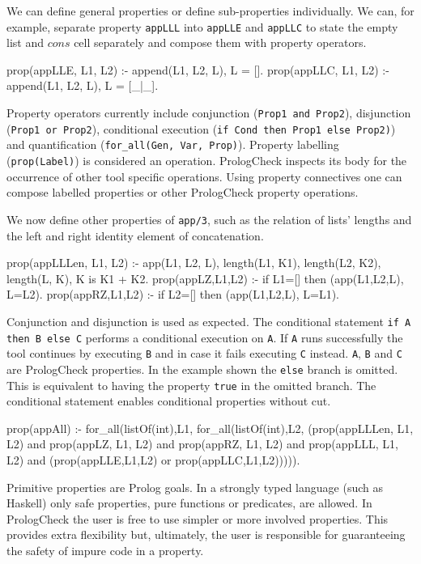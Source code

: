 \documentclass[runningheads,a4paper]{llncs}
\newcommand{\yap}[1]{\lstinline[style=yap]{#1}}
\newcommand{\Prolog}[0]{{\sf Prolog}}
\newcommand{\Haskell}[0]{{\sf Haskell}}
\newcommand{\plqc}[0]{{\sf PrologCheck}}
\begin{document}
We can define general properties or define sub-properties individually. 
%
We can, for example, separate property \yap{appLLL} into
\yap{appLLE} and \yap{appLLC} to state the empty list and $cons$
cell separately and compose them with property operators.
%
\begin{yapcode}
 prop({appLLE, L1, L2}) :- append(L1, L2, L), L = [].
 prop({appLLC, L1, L2}) :- append(L1, L2, L), L = [_|_].
\end{yapcode}


Property operators currently  include conjunction
 (\yap{Prop1 and Prop2}), disjunction (\yap{Prop1 or Prop2}), conditional
execution (\yap{if Cond then Prop1 else Prop2)}) and quantification
(\yap{for_all(Gen, Var, Prop)}).
%
Property labelling (\yap{prop(Label)}) is considered an operation.
%
\plqc{} inspects its body for the occurrence of other tool specific
operations.
%
Using property connectives one can compose labelled properties or 
other \plqc{} property operations.




We now define other properties of \yap{app/3}, such as the relation
of lists' lengths and the left and right identity element of
concatenation.
%
\begin{yapcode}
 prop({appLLLen, L1, L2}) :- app(L1, L2, L),
   length(L1, K1), length(L2, K2), length(L, K), K is K1 + K2.
 prop({appLZ,L1,L2}) :- if L1=[] then (app(L1,L2,L), L=L2).
 prop({appRZ,L1,L2}) :- if L2=[] then (app(L1,L2,L), L=L1).
\end{yapcode}
%
Conjunction and disjunction is used as expected.
%
The conditional statement \yap{if A then B else C} performs a
conditional execution on \yap{A}. 
%
If \yap{A} runs successfully the tool continues by executing \yap{B} and in case it
fails executing \yap{C} instead.
%
\yap{A}, \yap{B} and \yap{C} are \plqc{} properties.
%
In the example shown the \yap{else} branch is omitted.
%
This is equivalent to having the property \yap{true} in the omitted branch.
%
The conditional statement enables conditional properties without cut. 
%
\begin{yapcode}
 prop(appAll) :- for_all(listOf(int),L1, for_all(listOf(int),L2,
   (prop({appLLLen, L1, L2}) and prop({appLZ, L1, L2})
   and prop({appRZ, L1, L2}) and prop({appLLL, L1, L2})
   and (prop({appLLE,L1,L2}) or prop({appLLC,L1,L2}))))).
\end{yapcode}



Primitive properties are \Prolog{} goals.
%
In a strongly typed language (such as \Haskell{}) only
safe properties, pure functions or predicates, are allowed.
%
In \plqc{} the user is free to use simpler or more involved properties.
%
This provides extra flexibility but, ultimately, the user is
responsible for guaranteeing the safety of impure code in a property.
\end{document}
